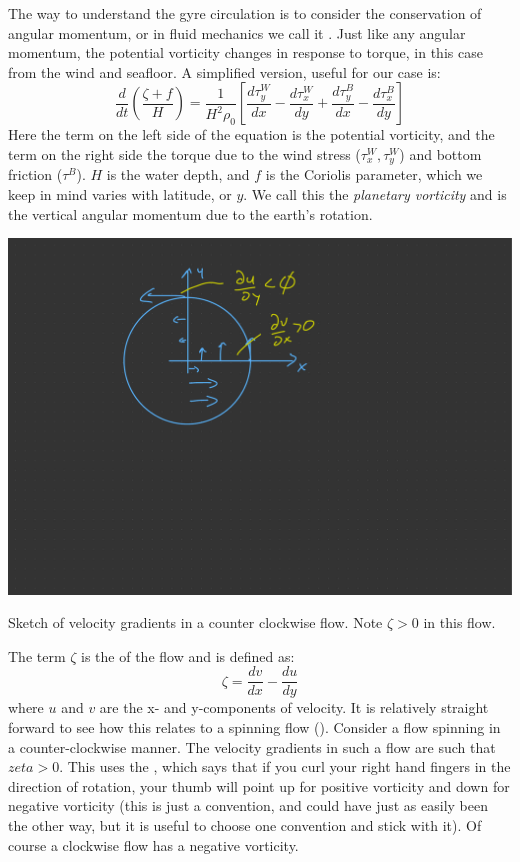The way to understand the gyre circulation is to consider the conservation of angular momentum, or in fluid mechanics we call it .  Just like any angular momentum, the potential vorticity changes in response to torque, in this case from the wind and seafloor.  A simplified version, useful for our case is:
\begin{equation}
    \frac{d}{dt}\left(\frac{\zeta + f}{H} \right) = \frac{1}{H^2\rho_0} \left[\frac{d\tau_y^W}{dx} - \frac{d\tau_x^W}{dy} + \frac{d\tau_y^B}{dx} - \frac{d\tau_x^B}{dy}\right]
    \label{eq:conspotvort}
\end{equation}
Here the term on the left side of the equation is the potential vorticity, and the term on the right side the torque due to the wind stress ($\tau_x^W, \tau_y^W$) and bottom friction ($\tau^B$).  $H$ is the water depth, and $f$ is the Coriolis parameter, which we keep in mind varies with latitude, or $y$.  We call this the \emph{planetary vorticity} and is the vertical angular momentum due to the earth's rotation.  
\begin{marginfigure}
    \includegraphics{figs/Sverdrup/relativevortsketch}
    \caption{Sketch of velocity gradients in a counter clockwise flow.  Note $\zeta>0$ in this flow.}
    \label{fig:relativevortsketch}  
\end{marginfigure}
The term $\zeta$ is the  of the flow and is defined as:
\begin{equation}
    \zeta = \frac{dv}{dx} - \frac{du}{dy}
\end{equation}
where $u$ and $v$ are the x- and y-components of velocity.  It is relatively straight forward to see how this relates to a spinning flow ().  Consider a flow spinning in a counter-clockwise manner.  The velocity gradients in such a flow are such that $zeta > 0$.  This uses the , which says that if you curl your right hand fingers in the direction of rotation, your thumb will point up for positive vorticity and down for negative vorticity (this is just a convention, and could have just as easily been the other way, but it is useful to choose one convention and stick with it).  Of course a clockwise flow has a negative vorticity.  

